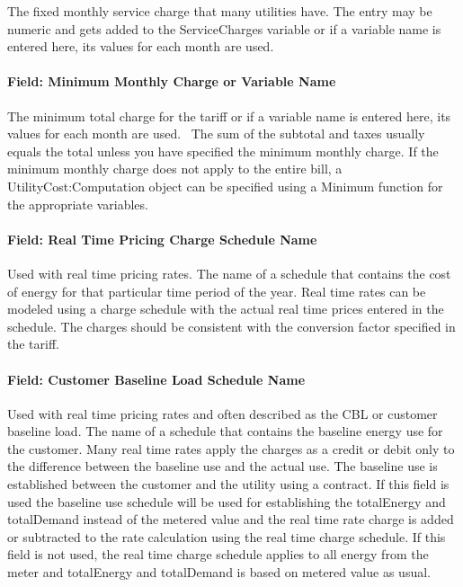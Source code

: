 The fixed monthly service charge that many utilities have. The entry may be numeric and gets added to the ServiceCharges variable or if a variable name is entered here, its values for each month are used.

\paragraph{Field: Minimum Monthly Charge or Variable Name}\label{field-minimum-monthly-charge-or-variable-name}

The minimum total charge for the tariff or if a variable name is entered here, its values for each month are used.~ The sum of the subtotal and taxes usually equals the total unless you have specified the minimum monthly charge. If the minimum monthly charge does not apply to the entire bill, a UtilityCost:Computation object can be specified using a Minimum function for the appropriate variables.

\paragraph{Field: Real Time Pricing Charge Schedule Name}\label{field-real-time-pricing-charge-schedule-name}

Used with real time pricing rates. The name of a schedule that contains the cost of energy for that particular time period of the year. Real time rates can be modeled using a charge schedule with the actual real time prices entered in the schedule. The charges should be consistent with the conversion factor specified in the tariff.

\paragraph{Field: Customer Baseline Load Schedule Name}\label{field-customer-baseline-load-schedule-name}

Used with real time pricing rates and often described as the CBL or customer baseline load. The name of a schedule that contains the baseline energy use for the customer. Many real time rates apply the charges as a credit or debit only to the difference between the baseline use and the actual use. The baseline use is established between the customer and the utility using a contract. If this field is used the baseline use schedule will be used for establishing the totalEnergy and totalDemand instead of the metered value and the real time rate charge is added or subtracted to the rate calculation using the real time charge schedule. If this field is not used, the real time charge schedule applies to all energy from the meter and totalEnergy and totalDemand is based on metered value as usual.

